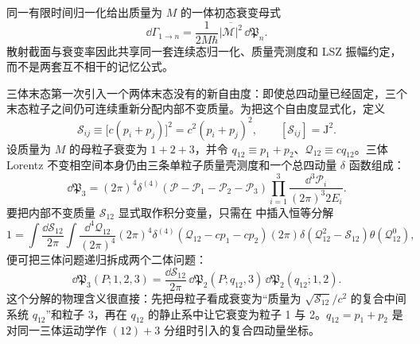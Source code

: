 同一有限时间归一化给出质量为 \(M\) 的一体初态衰变母式
\begin{equation}
 \boxed{
 \dd\Gamma_{1\to n}
 =\frac{1}{2M\hbar}
 \overline{|\mathcal M|^2}\,\dd\mathfrak P_n.}
 \label{eq:master-decay-rate-si-r9}
\end{equation}
散射截面与衰变率因此共享同一套连续态归一化、质量壳测度和 LSZ 振幅约定，而不是两套互不相干的记忆公式。


三体末态第一次引入一个两体末态没有的新自由度：即使总四动量已经固定，三个末态粒子之间仍可连续重新分配内部不变质量。为把这个自由度显式化，定义
\begin{equation}
 \mathcal S_{ij}
 \equiv \bigl[c(p_i+p_j)\bigr]^2
 =c^2(p_i+p_j)^2,
 \qquad [\mathcal S_{ij}]=\mathrm{J^2}.
 \label{eq:threebody-invariant-mass-energy2-dp52}
\end{equation}
设质量为 $M$ 的母粒子衰变为 $1+2+3$，并令
$q_{12}\equiv p_1+p_2$、$\mathcal Q_{12}\equiv c q_{12}$。三体 Lorentz 不变相空间本身仍由三条单粒子质量壳测度和一个总四动量 $\delta$ 函数组成：
\begin{equation}
 \boxed{
 \dd\mathfrak P_3
 =(2\pi)^4\delta^{(4)}
 (\mathcal P-\mathcal P_1-\mathcal P_2-\mathcal P_3)
 \prod_{i=1}^{3}
 \frac{\dd^3 \boldsymbol{\mathcal P}_i}{(2\pi)^3 2E_i}.}
 \label{eq:phase3-definition-dp68}
\end{equation}
要把内部不变质量 $\mathcal S_{12}$ 显式取作积分变量，只需在 中插入恒等分解
\begin{equation*}
 1=\int\frac{\dd\mathcal S_{12}}{2\pi}
 \int\frac{\dd^4 \mathcal Q_{12}}{(2\pi)^4}
 (2\pi)^4\delta^{(4)}(\mathcal Q_{12}-c p_1-c p_2)
 (2\pi)\delta(\mathcal Q_{12}^2-\mathcal S_{12})\theta(\mathcal Q_{12}^0),
\end{equation*}
便可把三体问题递归拆成两个二体问题：
\begin{equation}
 \boxed{
 \dd\mathfrak P_3(P;1,2,3)
 =\frac{\dd\mathcal S_{12}}{2\pi}\,
 \dd\mathfrak P_2(P;q_{12},3)\,
 \dd\mathfrak P_2(q_{12};1,2).}
 \label{eq:phase3-recursive-dp52}
\end{equation}
这个分解的物理含义很直接：先把母粒子看成衰变为“质量为 $\sqrt{\mathcal S_{12}}/c^2$ 的复合中间系统 $q_{12}$”和粒子 3，再在 $q_{12}$ 的静止系中让它衰变为粒子 1 与 2。$q_{12}=p_1+p_2$ 是对同一三体运动学作 $(12)+3$ 分组时引入的复合四动量坐标。

